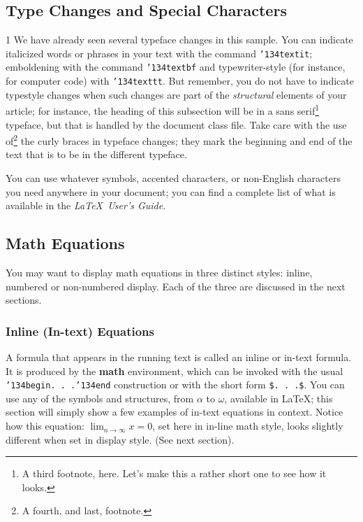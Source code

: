 \documentclass{sig-alternate-05-2015}
\begin{document}
\subsection{Type Changes and {\subsecit Special} Characters}1
We have already seen several typeface changes in this sample.  You
can indicate italicized words or phrases in your text with
the command \texttt{{\char'134}textit}; emboldening with the
command \texttt{{\char'134}textbf}
and typewriter-style (for instance, for computer code) with
\texttt{{\char'134}texttt}.  But remember, you do not
have to indicate typestyle changes when such changes are
part of the \textit{structural} elements of your
article; for instance, the heading of this subsection will
be in a sans serif\footnote{A third footnote, here.
Let's make this a rather short one to
see how it looks.} typeface, but that is handled by the
document class file. Take care with the use
of\footnote{A fourth, and last, footnote.}
the curly braces in typeface changes; they mark
the beginning and end of
the text that is to be in the different typeface.

You can use whatever symbols, accented characters, or
non-English characters you need anywhere in your document;
you can find a complete list of what is
available in the \textit{\LaTeX\
User's Guide}\cite{Lamport:LaTeX}.

\subsection{Math Equations}
You may want to display math equations in three distinct styles:
inline, numbered or non-numbered display.  Each of
the three are discussed in the next sections.

\subsubsection{Inline (In-text) Equations}
A formula that appears in the running text is called an
inline or in-text formula.  It is produced by the
\textbf{math} environment, which can be
invoked with the usual \texttt{{\char'134}begin. . .{\char'134}end}
construction or with the short form \texttt{\$. . .\$}. You
can use any of the symbols and structures,
from $\alpha$ to $\omega$, available in
\LaTeX\cite{Lamport:LaTeX}; this section will simply show a
few examples of in-text equations in context. Notice how
this equation: \begin{math}\lim_{n\rightarrow \infty}x=0\end{math},
set here in in-line math style, looks slightly different when
set in display style.  (See next section).
\end{document}
